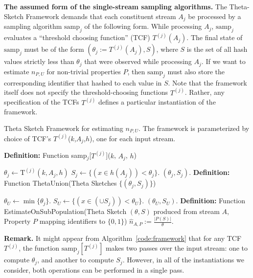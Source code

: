 \documentclass{article}
\newcommand{\samp}{\mathrm{samp}}
\newlength\myindent
\newcommand\bindent{\begingroup
  \setlength{\itemindent}{\myindent}
  \addtolength{\algorithmicindent}{\myindent}
}
\newcommand\eindent{\endgroup}
\begin{document}
\medskip
\noindent \textbf{The assumed form of the single-stream sampling algorithms.}
The Theta-Sketch Framework demands that each constituent stream $A_j$ be processed by 
a sampling algorithm $\samp_j$ of the following form. While processing $A_j$, $\samp_j$
evaluates a ``threshold choosing function'' (TCF) $T^{(j)}(A_j)$. The final state of $\samp_j$ must be of the form
$(\theta_j:=T^{(j)}(A_j), S)$, where $S$ is the set of all hash values strictly less than $\theta_j$ that were observed while processing $A_j$. If we want to estimate $n_{P, U}$ for non-trivial properties $P$, then $\samp_j$
must also store the corresponding identifier that hashed to each value in $S$.
Note that the framework itself does not specify the threshold-choosing functions $T^{(j)}$. Rather, any specification of the TCFs
$T^{(j)}$ defines a particular instantiation of the framework.

{\small
\begin{algorithm}[t]
{\small
\caption{\small{Theta Sketch Framework for estimating $n_{P, U}$. The framework is parameterized by 
choice of TCF's $T^{(j)}$($k$,$A_j$,$h$), one for each input stream.}}\label{code:framework}
\begin{algorithmic}[1]{\footnotesize
\vspace{0.5em}
\STATE \textbf{Definition:} Function samp$_j$[$T^{(j)}$]($k$, $A_j$, $h$)
\bindent
\STATE  $\theta_j \leftarrow \mathrm{T}^{(j)}(k,A_j,h)$
\STATE $S_j \leftarrow \{ (x \in h(A_j)) < \theta_j \}$. \label{code:framework-line-3}
\RETURN $(\theta_j,S_j)$.
\eindent
\vspace{0.5em}
\STATE \textbf{Definition:} Function ThetaUnion(Theta Sketches $\{ (\theta_j,S_j) \}$)
\bindent
 \STATE  $\theta_U \leftarrow \min \{\theta_j\}$. 
 \STATE $S_U \leftarrow \{ (x \in (\cup S_j)) < \theta_U \}$. \label{code:framework-line-7}
 \RETURN $(\theta_U,S_U)$.
 \eindent
\vspace{0.5em}
\STATE \textbf{Definition:} Function EstimateOnSubPopulation(Theta Sketch $(\theta,S)$ produced from stream $A$, Property $P$ mapping identifiers to $\{0, 1\}$)
\bindent \RETURN  $\hat{n}_{A,P} := \frac{|P(S)|}{\theta}$.
\eindent
}\end{algorithmic}
}
\end{algorithm}
}

\medskip
\noindent \textbf{Remark.} It might appear from Algorithm~\ref{code:framework} that for any TCF $T^{(j)}$, the function $\samp_j[T^{(j)}]$ makes two passes over the input stream: one to compute $\theta_j$, and another to compute $S_j$.  However, in all of the instantiations we consider, both operations can be performed in a single pass.
\end{document}
